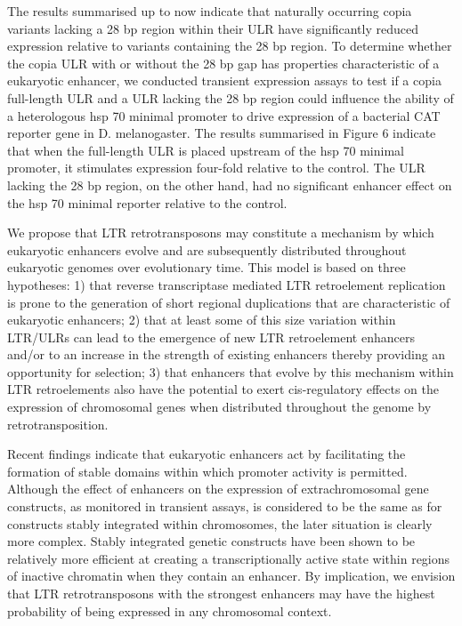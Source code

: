 The results summarised up to now indicate that naturally occurring copia variants lacking a 28 bp region within their ULR have significantly reduced expression relative to variants containing the 28 bp region. To determine whether the copia ULR with or without the 28 bp gap has properties characteristic of a eukaryotic enhancer, we conducted transient expression assays to test if a copia full-length ULR and a ULR lacking the 28 bp region could influence the ability of a heterologous hsp 70 minimal promoter to drive expression of a bacterial CAT reporter gene in D. melanogaster. The results summarised in Figure 6 indicate that when the full-length ULR is placed upstream of the hsp 70 minimal promoter, it stimulates expression four-fold relative to the control. The ULR lacking the 28 bp region, on the other hand, had no significant enhancer effect on the hsp 70 minimal reporter relative to the control.

We propose that LTR retrotransposons may constitute a mechanism by which eukaryotic enhancers evolve and are subsequently distributed throughout eukaryotic genomes over evolutionary time. This model is based on three hypotheses: 1) that reverse transcriptase mediated LTR retroelement replication is prone to the generation of short regional duplications that are characteristic of eukaryotic enhancers; 2) that at least some of this size variation within LTR/ULRs can lead to the emergence of new LTR retroelement enhancers and/or to an increase in the strength of existing enhancers thereby providing an opportunity for selection; 3) that enhancers that evolve by this mechanism within LTR retroelements also have the potential to exert cis-regulatory effects on the expression of chromosomal genes when distributed throughout the genome by retrotransposition.

Recent findings indicate that eukaryotic enhancers act by facilitating the formation of stable domains within which promoter activity is permitted. Although the effect of enhancers on the expression of extrachromosomal gene constructs, as monitored in transient assays, is considered to be the same as for constructs stably integrated within chromosomes, the later situation is clearly more complex. Stably integrated genetic constructs have been shown to be relatively more efficient at creating a transcriptionally active state within regions of inactive chromatin when they contain an enhancer. By implication, we envision that LTR retrotransposons with the strongest enhancers may have the highest probability of being expressed in any chromosomal context.

